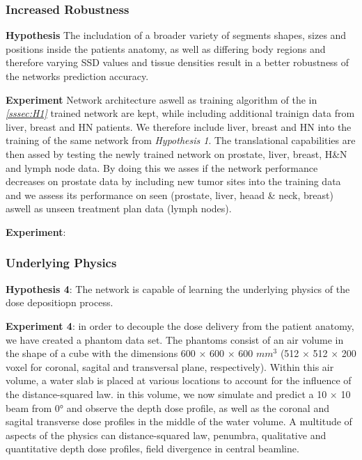 \subsubsection{Increased Robustness}\label{sssec:H3}
\begin{hanginglist}\itemsep2pt

    \item\textbf{Hypothesis}\newline
    The includation of a broader variety of segments shapes, sizes and positions inside the patients anatomy, as well as differing body regions and therefore varying \acs{SSD} values and tissue densities result in a better robustness of the networks prediction accuracy. 

    \item\textbf{Experiment}\newline
    Network architecture aswell as training algorithm of the in \emph{\ref{sssec:H1} } trained network are kept, while including additional trainign data from liver, breast and \acs{HN} patients. 
    We therefore include liver, breast and \ac{HN} into the training of the same network from \emph{Hypothesis 1}. The translational capabilities are then assed by testing the newly trained network on prostate, liver, breast, H\&N and lymph node data. By doing this we asses if the network performance decreases on prostate data by including new tumor sites into the training data and we assess its performance on seen (prostate, liver, heaad \& neck, breast) aswell as unseen treatment plan data (lymph nodes).

    \item\textbf{Experiment}:
\end{hanginglist}

\subsubsection{Underlying Physics}\label{sssec:H4}
\begin{hanginglist}\itemsep2pt
    \item\textbf{Hypothesis 4}: The network is capable of learning the underlying physics of the dose depositiopn process. 
    \item\textbf{Experiment 4}: in order to decouple the dose delivery from the patient anatomy, we have created a phantom data set. The phantoms consist of an air volume in the shape of a cube with the dimensions 600 $\times$ 600 $\times$ 600 $mm^3$ (512 $\times$ 512 $\times$ 200 voxel for coronal, sagital and transversal plane, respectively). Within this air volume, a water slab is placed at various locations to account for the influence of the distance-squared law. in this volume, we now simulate and predict a 10 $\times$ 10 beam from 0° and observe the depth dose profile, as well as the coronal and sagital transverse dose profiles in the middle of the water volume. A multitude of aspects of the physics can distance-squared law, penumbra, qualitative and quantitative depth dose profiles, field divergence in central beamline. 
\end{hanginglist}

